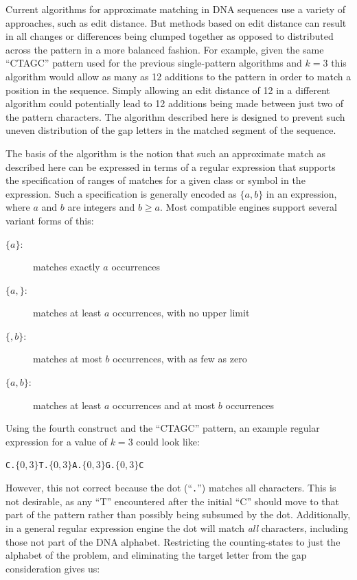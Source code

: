 Current algorithms for approximate matching in DNA sequences use a variety of approaches, such as edit distance. But methods based on edit distance can result in all changes or differences being clumped together as opposed to distributed across the pattern in a more balanced fashion. For example, given the same ``CTAGC'' pattern used for the previous single-pattern algorithms and $k = 3$ this algorithm would allow as many as 12 additions to the pattern in order to match a position in the sequence. Simply allowing an edit distance of 12 in a different algorithm could potentially lead to 12 additions being made between just two of the pattern characters. The algorithm described here is designed to prevent such uneven distribution of the gap letters in the matched segment of the sequence.

The basis of the algorithm is the notion that such an approximate match as described here can be expressed in terms of a regular expression that supports the specification of ranges of matches for a given class or symbol in the expression. Such a specification is generally encoded as \texttt{$\lbrace a,b \rbrace$} in an expression, where $a$ and $b$ are integers and $b \geq a$. Most compatible engines support several variant forms of this:

\begin{description}
\item[\texttt{$\lbrace a \rbrace$}:] matches exactly $a$ occurrences
\item[\texttt{$\lbrace a, \rbrace$}:] matches at least $a$ occurrences, with no upper limit
\item[\texttt{$\lbrace ,b \rbrace$}:] matches at most $b$ occurrences, with as few as zero
\item[\texttt{$\lbrace a,b \rbrace$}:] matches at least $a$ occurrences and at most $b$ occurrences
\end{description}

Using the fourth construct and the ``CTAGC'' pattern, an example regular expression for a value of $k = 3$ could look like:

\begin{center}
\texttt{C.$\lbrace 0,3 \rbrace$T.$\lbrace 0,3 \rbrace$A.$\lbrace 0,3 \rbrace$G.$\lbrace 0,3 \rbrace$C}
\end{center}

However, this not correct because the dot (``\texttt{.}'') matches all characters. This is not desirable, as any ``T'' encountered after the initial ``C'' should move to that part of the pattern rather than possibly being subsumed by the dot. Additionally, in a general regular expression engine the dot will match \textit{all} characters, including those not part of the DNA alphabet. Restricting the counting-states to just the alphabet of the problem, and eliminating the target letter from the gap consideration gives us:

